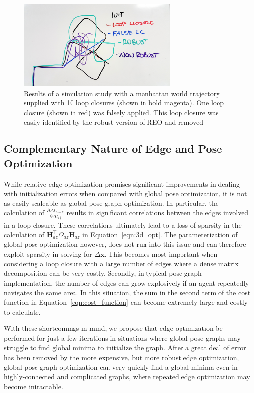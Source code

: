 \begin{figure}[H]
  \includegraphics[width=0.7\textwidth]{figures/robust_lc_rejection.jpg}
  \caption{Results of a simulation study with a manhattan world trajectory supplied with 10 loop closures (shown in bold magenta).  One loop closure (shown in red) was falsely applied.  This loop closure was easily identified by the robust version of REO and removed}
  \label{fig:false_loop_closure}
\end{figure}

\subsection{Complementary Nature of Edge and Pose Optimization}

While relative edge optimization promises significant improvements in dealing with initialization errors when compared with global pose optimization, it is not as easily scaleable as global pose graph optimization.  In particular, the calculation of $\frac {\partial\Delta t_{a-z}}{\partial\Delta t_{ij}}$ results in significant correlations between the edges involved in a loop closure.  These correlations ultimately lead to a loss of sparsity in the calculation of $\mathbf{H}_{az}^\top \Omega_{az} \mathbf{H}_{az}$ in Equation~\ref{eqn:3d_opt}.  The parameterization of global pose optimization however, does not run into this issue and can therefore exploit sparsity in solving for $\Delta \mathbf{x}$.  This becomes most important when considering a loop closure with a large number of edges where a dense matrix decomposition can be very costly. Secondly, in typical pose graph implementation, the number of edges can grow explosively if an agent repeatedly navigates the same area.  In this situation, the sum in the second term of the cost function in Equation~\ref{eqn:cost_function} can become extremely large and costly to calculate.

With these shortcomings in mind, we propose that edge optimization be performed for just a few iterations in situations where global pose graphs may struggle to find global minima to initialize the graph.  After a great deal of error has been removed by the more expensive, but more robust edge optimization, global pose graph optimization can very quickly find a global minima even in highly-connected and complicated graphs, where repeated edge optimization may become intractable.

